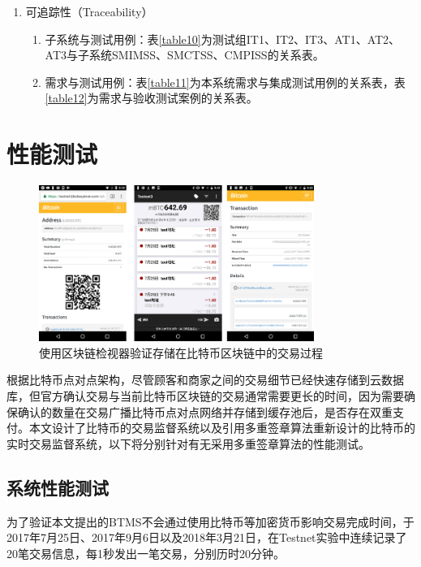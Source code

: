 \begin{enumerate}
			\item 可追踪性（Traceability）

						

			\begin{enumerate}
				\item 子系统与测试用例：表\ref{table10}为测试组IT1、IT2、IT3、AT1、AT2、AT3与子系统SMIMSS、SMCTSS、CMPISS的关系表。
				\item 需求与测试用例：表\ref{table11}为本系统需求与集成测试用例的关系表，表\ref{table12}为需求与验收测试案例的关系表。
				\end{enumerate}
		\end{enumerate}


	\section{性能测试}


		\begin{figure}[!htbp]
			\centering
			\includegraphics[width = 0.8\textwidth]{fig9.png}
			\caption{使用区块链检视器验证存储在比特币区块链中的交易过程}\label{fig9}
		\end{figure}


		根据比特币点对点架构，尽管顾客和商家之间的交易细节已经快速存储到云数据库，但官方确认交易与当前比特币区块链的交易通常需要更长的时间，因为需要确保确认的数量在交易广播比特币点对点网络并存储到缓存池后，是否存在双重支付。本文设计了比特币的交易监督系统以及引用多重签章算法重新设计的比特币的实时交易监督系统，以下将分别针对有无采用多重签章算法的性能测试。


		\subsection{系统性能测试}
		为了验证本文提出的BTMS不会通过使用比特币等加密货币影响交易完成时间，于2017年7月25日、2017年9月6日以及2018年3月21日，在Testnet实验中连续记录了20笔交易信息，每1秒发出一笔交易，分别历时20分钟。

